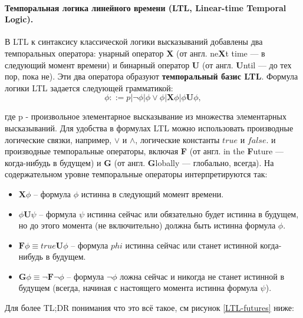 \paragraph{\textbf{Темпоральная логика} линейного времени (LTL, Linear-time Temporal Logic).} 
\text{}
\newline
В LTL к синтаксису классической логики высказываний добавлены два темпоральных оператора: унарный оператор \textbf{X} (от англ. ne\textbf{X}t time — в следующий момент времени) и бинарный оператор \textbf{U} (от англ. \textbf{U}ntil — до тех пор, пока не). 
Эти два оператора образуют \textbf{темпоральный базис LTL}. 
Формула логики LTL задается следующей грамматикой:
\begin{equation}
  \phi ::= p | \neg \phi | \phi \vee \phi  |  \textbf{X}\phi | \phi \textbf{U} \phi,
\end{equation}

где p - произвольное элементарное высказывание из множества элементарных высказываний.
Для удобства в формулах LTL можно использовать производные логические связки, например, $\vee$ и $\wedge$, логические константы \textit{$true$}  и  \textit{$false$}. и производные темпоральные операторы, включая \textbf{F} (от англ. in the \textbf{F}uture — когда-нибудь в будущем) и \textbf{G} (от англ. \textbf{G}lobally — глобально, всегда). На содержательном уровне темпоральные операторы интерпретируются так: 

\begin{itemize}
	\item $\textbf{X}\phi$ -- формула $\phi$ истинна в следующий момент времени.
	\item $\phi\textbf{U}\psi$ -- формула $\psi$ истинна сейчас или $\textbf{обязательно}$ будет истинна в $\textbf{будущем}$, но до этого момента (не включительно) должна быть истинна формула $\phi$.
	\item $\textbf{F}\phi \equiv \textit{true} \textbf{U} \phi$ -- формула $phi$ истинна сейчас или станет истинной когда-нибудь в будущем. 
	\item $\textbf{G}\phi \equiv \neg \textbf{F} \neg \phi$ -- формула $\neg \phi$ ложна сейчас и никогда не станет истинной в $\textit{будущем}$ ($\textit{всегда}$, начиная с настоящего момента истинна формула $\psi$).
\end{itemize}

Для более TL;DR понимания что это всё такое, см рисунок \ref{LTL-futures} ниже:

